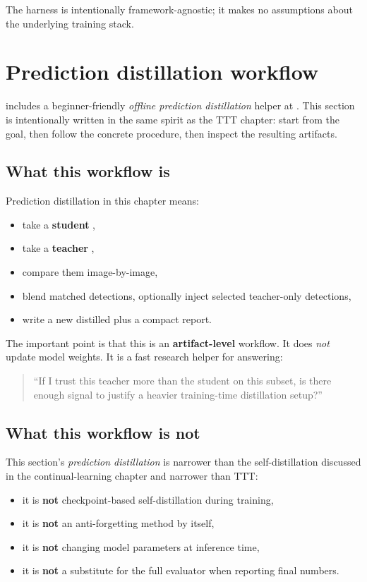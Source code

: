 The harness is intentionally framework-agnostic; it makes no assumptions about the underlying training stack.

\section{Prediction distillation workflow}
\yolozu{} includes a beginner-friendly \emph{offline prediction distillation} helper at
. This section is intentionally written in the same spirit as the TTT chapter:
start from the goal, then follow the concrete procedure, then inspect the resulting artifacts.

\subsection{What this workflow is}
Prediction distillation in this chapter means:
\begin{itemize}
  \item take a \textbf{student} ,
  \item take a \textbf{teacher} ,
  \item compare them image-by-image,
  \item blend matched detections, optionally inject selected teacher-only detections,
  \item write a new distilled  plus a compact report.
\end{itemize}

The important point is that this is an \textbf{artifact-level} workflow.
It does \emph{not} update model weights. It is a fast research helper for answering:
\begin{quote}
``If I trust this teacher more than the student on this subset, is there enough signal to justify a heavier training-time distillation setup?''
\end{quote}

\subsection{What this workflow is not}
This section's \emph{prediction distillation} is narrower than the self-distillation discussed in the continual-learning chapter and narrower than TTT:
\begin{itemize}
  \item it is \textbf{not} checkpoint-based self-distillation during training,
  \item it is \textbf{not} an anti-forgetting method by itself,
  \item it is \textbf{not} changing model parameters at inference time,
  \item it is \textbf{not} a substitute for the full evaluator when reporting final numbers.
\end{itemize}

